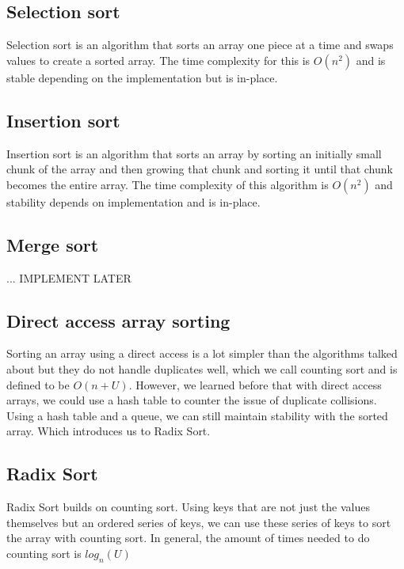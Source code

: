 \documentclass[11pt,a4paper,english]{paper}
\begin{document}
\subsection{Selection sort}

Selection sort is an algorithm that sorts an array one piece at a time and swaps values to create a sorted array. The time complexity for this is $O(n^2)$ and is stable depending on the implementation but is in-place.

\subsection{Insertion sort}

Insertion sort is an algorithm that sorts an array by sorting an initially small chunk of the array and then growing that chunk and sorting it until that chunk becomes the entire array. The time complexity of this algorithm is $O(n^2)$ and stability depends on implementation and is in-place.

\subsection{Merge sort}

... IMPLEMENT LATER

\subsection{Direct access array sorting}

Sorting an array using a direct access is a lot simpler than the algorithms talked about but they do not handle duplicates well, which we call counting sort and is defined to be $O(n + U)$. However, we learned before that with direct access arrays, we could use a hash table to counter the issue of duplicate collisions. Using a hash table and a queue, we can still maintain stability with the sorted array. Which introduces us to Radix Sort.

\subsection{Radix Sort}

Radix Sort builds on counting sort. Using keys that are not just the values themselves but an ordered series of keys, we can use these series of keys to sort the array with counting sort. In general, the amount of times needed to do counting sort is $log_{n}{(U)}$
\end{document}

